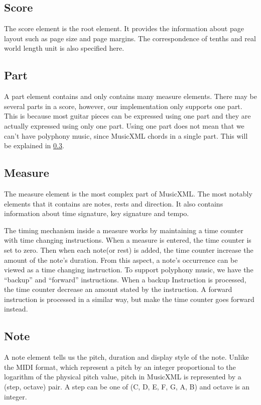 \subsection{Score}
The score element is the root element. It provides the information about page layout such as page size and page margins. The correspondence of tenths and real world length unit is also specified here.

\subsection{Part}
A part element contains and only contains many measure elements. There may be several parts in a score, however, our implementation only supports one part. This is because most guitar pieces can be expressed using one part and they are actually expressed using only one part. Using one part does not mean that we can't have polyphony music, since MusicXML chords in a single part. This will be explained in \ref{section:measure}.

\subsection{Measure}
\label{section:measure}
The measure element is the most complex part of MusicXML. The most notably elements that it contains are notes, rests and direction. It also contains information about time signature, key signature and tempo.

The timing mechanism inside a measure works by maintaining a time counter with time changing instructions. When a measure is entered, the time counter is set to zero. Then when each note(or rest) is added, the time counter increase the amount of the note's duration. From this aspect, a note's occurrence can be viewed as a time changing instruction. To support polyphony music, we have the ``backup'' and ``forward'' instructions. When a backup Instruction is processed, the time counter decrease an amount stated by the instruction. A forward instruction is processed in a similar way, but make the time counter goes forward instead.

\subsection{Note}
A note element tells us the pitch, duration and display style of the note. Unlike the MIDI format, which represent a pitch by an integer proportional to the logarithm of the physical pitch value, pitch in MusicXML is represented by a (step, octave) pair. A step can be one of (C, D, E, F, G, A, B) and octave is an integer.

